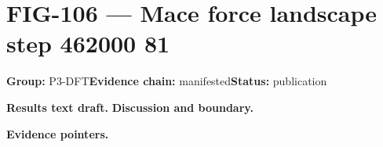 \clearpage
\section{FIG-106 --- Mace force landscape step 462000 81}
\label{figpage:fig-106}
\textbf{Group:} P3-DFT\quad \textbf{Evidence chain:} manifested\quad \textbf{Status:} publication

\textbf{Results text draft.} 
\textbf{Discussion and boundary.} 


\textbf{Evidence pointers.}



\vfill
